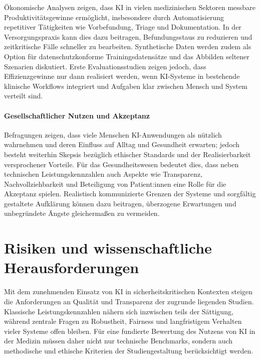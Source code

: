 \documentclass[lettersize,journal]{IEEEtran}
\begin{document}
Ökonomische Analysen zeigen, dass KI in vielen medizinischen Sektoren messbare Produktivitätsgewinne ermöglicht, insbesondere durch Automatisierung repetitiver Tätigkeiten wie Vorbefundung, Triage und Dokumentation\cite{ref:hai2025aiindex}\cite{ref:faiyazuddin2025}. In der Versorgungspraxis kann dies dazu beitragen, Befundungsstaus zu reduzieren und zeitkritische Fälle schneller zu bearbeiten. Synthetische Daten werden zudem als Option für datenschutzkonforme Trainingsdatensätze und das Abbilden seltener Szenarien diskutiert\cite{ref:hai2025aiindex}. Erste Evaluationsstudien zeigen jedoch, dass Effizienzgewinne nur dann realisiert werden, wenn KI-Systeme in bestehende klinische Workflows integriert und Aufgaben klar zwischen Mensch und System verteilt sind\cite{ref:faiyazuddin2025}.

\paragraph{Gesellschaftlicher Nutzen und Akzeptanz}

Befragungen zeigen, dass viele Menschen KI-Anwendungen als nützlich wahrnehmen und deren Einfluss auf Alltag und Gesundheit erwarten; jedoch besteht weiterhin Skepsis bezüglich ethischer Standards und der Realisierbarkeit versprochener Vorteile\cite{ref:hai2025aiindex}. Für das Gesundheitswesen bedeutet dies, dass neben technischen Leistungskennzahlen auch Aspekte wie Transparenz, Nachvollziehbarkeit und Beteiligung von Patient:innen eine Rolle für die Akzeptanz spielen. Realistisch kommunizierte Grenzen der Systeme und sorgfältig gestaltete Aufklärung können dazu beitragen, überzogene Erwartungen und unbegründete Ängste gleichermaßen zu vermeiden.

\section{Risiken und wissenschaftliche Herausforderungen}
\label{sec:risiken}

Mit dem zunehmenden Einsatz von KI in sicherheitskritischen Kontexten steigen die Anforderungen an Qualität und Transparenz der zugrunde liegenden Studien. Klassische Leistungskennzahlen nähern sich inzwischen teils der Sättigung, während zentrale Fragen zu Robustheit, Fairness und langfristigem Verhalten vieler Systeme offen bleiben\cite{ref:hai2025aiindex}. Für eine fundierte Bewertung des Nutzens von KI in der Medizin müssen daher nicht nur technische Benchmarks, sondern auch methodische und ethische Kriterien der Studiengestaltung berücksichtigt werden.
\end{document}
